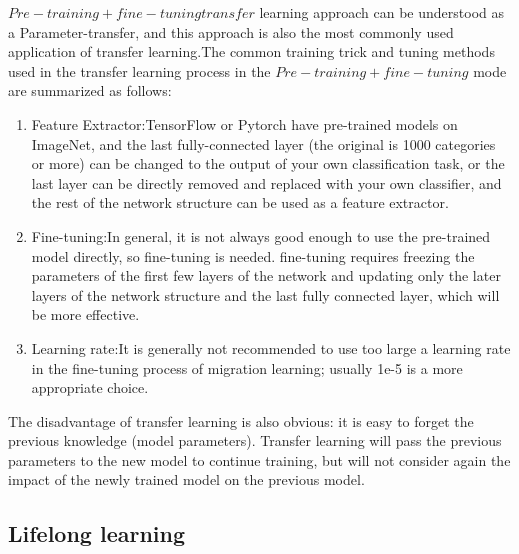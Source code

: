 $Pre-training + fine-tuning transfer$ learning approach can be understood as a Parameter-transfer, and this approach is also the most commonly used application of transfer learning.The common training trick and tuning methods used in the transfer learning process in the $Pre-training + fine-tuning$ mode are summarized as follows:
\begin{enumerate}[\qquad  1.]
	\item Feature Extractor:TensorFlow or Pytorch have pre-trained models on ImageNet, and the last fully-connected layer (the original is 1000 categories or more) can be changed to the output of your own classification task, or the last layer can be directly removed and replaced with your own classifier, and the rest of the network structure can be used as a feature extractor.
	\item Fine-tuning:In general, it is not always good enough to use the pre-trained model directly, so fine-tuning is needed. fine-tuning requires freezing the parameters of the first few layers of the network and updating only the later layers of the network structure and the last fully connected layer, which will be more effective.
	\item Learning rate:It is generally not recommended to use too large a learning rate in the fine-tuning process of migration learning; usually 1e-5 is a more appropriate choice.
\end{enumerate}

The disadvantage of transfer learning is also obvious: it is easy to forget the previous knowledge (model parameters). Transfer learning will pass the previous parameters to the new model to continue training, but will not consider again the impact of the newly trained model on the previous model.

\subsection{Lifelong learning}

